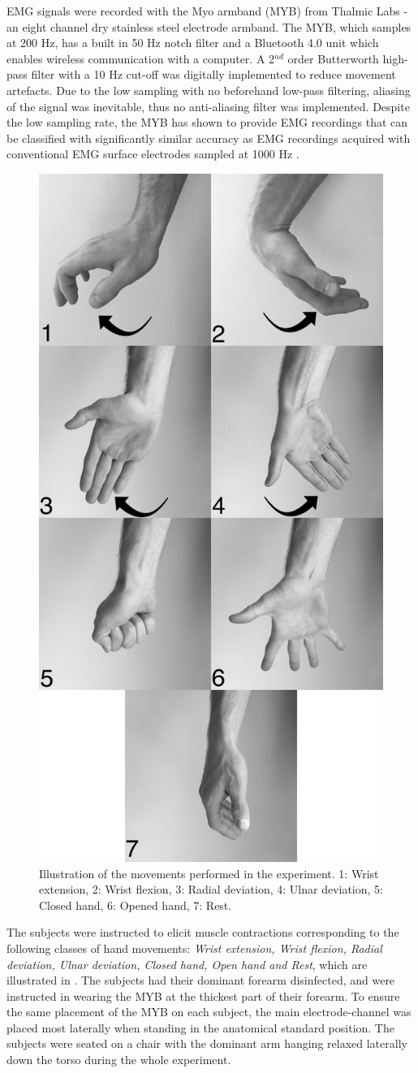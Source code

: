 EMG signals were recorded with the Myo armband (MYB) from Thalmic Labs - an eight channel dry stainless steel electrode armband. The MYB, which samples at 200 Hz, has a built in 50 Hz notch filter and a Bluetooth 4.0 unit which enables wireless communication with a computer. A 2$^{nd}$ order Butterworth high-pass filter with a 10 Hz cut-off was digitally implemented to reduce movement artefacts. Due to the low sampling with no beforehand low-pass filtering, aliasing of the signal was inevitable, thus no anti-aliasing filter was implemented. Despite the low sampling rate, the MYB has shown to provide EMG recordings that can be classified with significantly similar accuracy as EMG recordings acquired with conventional EMG surface electrodes sampled at 1000 Hz \cite{Mendez2017}. \\
\begin{figure}[H]                 
	\includegraphics[width=.35\textwidth]{figures/Paper/allHandMovementsVerticalBW}  
	\caption{Illustration of the movements performed in the experiment. 1: Wrist extension, 2: Wrist flexion, 3: Radial deviation, 4: Ulnar deviation, 5: Closed hand, 6: Opened hand, 7: Rest.}
	\label{fig:P:experiment_movements} 
\end{figure}
The subjects were instructed to elicit muscle contractions corresponding to the following classes of hand movements: \textit{Wrist extension, Wrist flexion, Radial deviation, Ulnar deviation, Closed hand, Open hand and Rest}, which are illustrated in . The subjects had their dominant forearm disinfected, and were instructed in wearing the MYB at the thickest part of their forearm. To ensure the same placement of the MYB on each subject, the main electrode-channel was placed most laterally when standing in the anatomical standard position. The subjects were seated on a chair with the dominant arm hanging relaxed laterally down the torso during the whole experiment. \\
